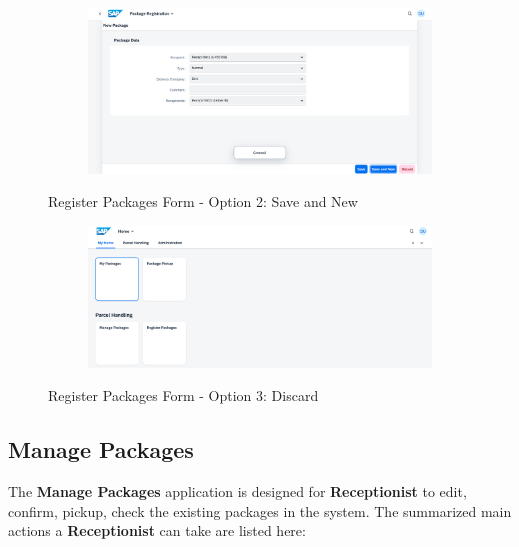 \begin{figure}[H]
	\centering
    \begin{subfigure}{1\linewidth}
        \centering
        \includegraphics[width=1\linewidth]{images/user_doc/registration/saveAndNewToast.png}
    \end{subfigure}
    \caption{Register Packages Form - Option 2: Save and New}
    \label{fig:RPsaveNewOp}
\end{figure}

\begin{figure}[H]
	\centering
    \begin{subfigure}{1\linewidth}
        \centering
        \includegraphics[width=1\linewidth]{images/user_doc/registration/discardTarget.png}
    \end{subfigure}
    \caption{Register Packages Form - Option 3: Discard}
    \label{fig:RPdiscardOp}
\end{figure}

\subsection{Manage Packages}                     
\label{subsec:mp}

The \textbf{Manage Packages} application is designed for \textbf{Receptionist} to edit, confirm, pickup, check the existing packages in the system. The summarized main actions a \textbf{Receptionist} can take are listed here:

